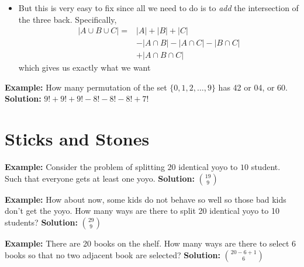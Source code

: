 \documentclass[a4paper, 12pt]{article}
\newcommand{\example}{\vspace{1em}\noindent\textbf{Example:} }
\newcommand{\solution}{\newline\noindent\textbf{Solution:} }
\begin{document}
\begin{multicols}{2}
\begin{itemize}
\begin{center}
\end{center}
		\item But this is very easy to fix since all we need to do is to \emph{add} the intersection of the three back. Specifically, 
		\begin{align*}
				|A \cup B \cup C|  =& |A|+|B|+|C|\\ 
				&- |A \cap B| - |A \cap C| - | B \cap C|\\
				& + |A \cap B \cap C|
		\end{align*}
		which gives us exactly what we want
 
	\end{itemize}
	\example How many permutation of the set $\{0,1,2,\ldots, 9\}$ has 42 or 04, or 60.
	\solution $9! + 9! + 9! - 8! -8! -8! + 7!$
	
	\section*{Sticks and Stones}
	\example Consider the problem of splitting $20$ identical yoyo to $10$ student. Such that everyone gets at least one yoyo.
	\solution$\displaystyle {19 \choose 9}$
	
	\example How about now, some kids do not behave so well so those bad kids don't get the yoyo. How many ways are there to split 20 identical yoyo to 10 students?
	\solution $\displaystyle {29 \choose 9}$
	
	
	\example There are 20 books on the shelf. How many ways are there to select 6 books so that no two adjacent book are selected?
	\solution $\displaystyle {20-6+1 \choose 6}$ 
	

\end{multicols}
\end{document}
